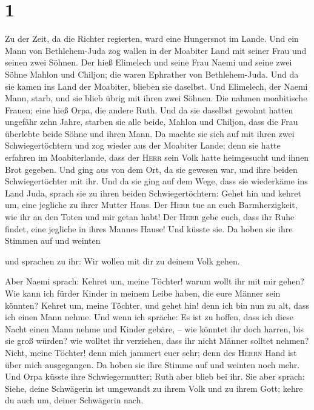 \hypertarget{section}{%
\section{1}\label{section}}

 Zu der Zeit, da die Richter regierten, ward eine
Hungersnot im Lande. Und ein Mann von Bethlehem-Juda zog wallen in der
Moabiter Land mit seiner Frau und seinen zwei Söhnen.  Der
hieß Elimelech und seine Frau Naemi und seine zwei Söhne Mahlon und
Chiljon; die waren Ephrather von Bethlehem-Juda. Und da sie kamen ins
Land der Moabiter, blieben sie daselbst.  Und Elimelech,
der Naemi Mann, starb, und sie blieb übrig mit ihren zwei Söhnen.
 Die nahmen moabitische Frauen; eine hieß Orpa, die andere
Ruth. Und da sie daselbst gewohnt hatten ungefähr zehn Jahre,
 starben sie alle beide, Mahlon und Chiljon, dass die Frau
überlebte beide Söhne und ihren Mann.  Da machte sie sich
auf mit ihren zwei Schwiegertöchtern und zog wieder aus der Moabiter
Lande; denn sie hatte erfahren im Moabiterlande, dass der \textsc{Herr}
sein Volk hatte heimgesucht und ihnen Brot gegeben.  Und
ging aus von dem Ort, da sie gewesen war, und ihre beiden
Schwiegertöchter mit ihr. Und da sie ging auf dem Wege, dass sie
wiederkäme ins Land Juda,  sprach sie zu ihren beiden
Schwiegertöchtern: Gehet hin und kehret um, eine jegliche zu ihrer
Mutter Haus. Der \textsc{Herr} tue an euch Barmherzigkeit, wie ihr an
den Toten und mir getan habt!  Der \textsc{Herr} gebe
euch, dass ihr Ruhe findet, eine jegliche in ihres Mannes Hause! Und
küsste sie. Da hoben sie ihre Stimmen auf und weinten

 und sprachen zu ihr: Wir wollen mit dir zu deinem Volk
gehen.

 Aber Naemi sprach: Kehret um, meine Töchter! warum wollt
ihr mit mir gehen? Wie kann ich fürder Kinder in meinem Leibe haben, die
eure Männer sein könnten?  Kehret um, meine Töchter, und
gehet hin! denn ich bin nun zu alt, dass ich einen Mann nehme. Und wenn
ich spräche: Es ist zu hoffen, dass ich diese Nacht einen Mann nehme und
Kinder gebäre, --  wie könntet ihr doch harren, bis sie
groß würden? wie wolltet ihr verziehen, dass ihr nicht Männer solltet
nehmen? Nicht, meine Töchter! denn mich jammert euer sehr; denn des
\textsc{Herrn} Hand ist über mich ausgegangen.  Da hoben
sie ihre Stimme auf und weinten noch mehr. Und Orpa küsste ihre
Schwiegermutter; Ruth aber blieb bei ihr.  Sie aber
sprach: Siehe, deine Schwägerin ist umgewandt zu ihrem Volk und zu ihrem
Gott; kehre du auch um, deiner Schwägerin nach.

